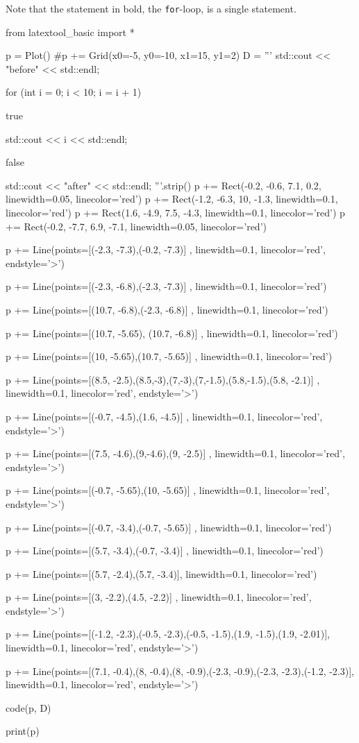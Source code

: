
Note that the statement in bold, the \texttt{for}-loop, is a single
statement.
\begin{python}
from latextool_basic import *

p = Plot()
#p += Grid(x0=-5, y0=-10, x1=15, y1=2)
D = '''
std::cout << "before" << std::endl;




for (int i = 0;        i < 10;        i = i + 1)



true

         std::cout << i << std::endl;

false




std::cout << "after" << std::endl;
'''.strip()
p += Rect(-0.2, -0.6, 7.1, 0.2, linewidth=0.05, linecolor='red')
p += Rect(-1.2, -6.3, 10, -1.3, linewidth=0.1, linecolor='red')
p += Rect(1.6, -4.9, 7.5, -4.3, linewidth=0.1, linecolor='red')
p += Rect(-0.2, -7.7, 6.9, -7.1, linewidth=0.05, linecolor='red')


p += Line(points=[(-2.3, -7.3),(-0.2, -7.3)] , linewidth=0.1, linecolor='red', endstyle='>')

p += Line(points=[(-2.3, -6.8),(-2.3, -7.3)] , linewidth=0.1, linecolor='red')

p += Line(points=[(10.7, -6.8),(-2.3, -6.8)] , linewidth=0.1, linecolor='red')

p += Line(points=[(10.7, -5.65), (10.7, -6.8)] , linewidth=0.1, linecolor='red')

p += Line(points=[(10, -5.65),(10.7, -5.65)] , linewidth=0.1, linecolor='red')

p += Line(points=[(8.5, -2.5),(8.5,-3),(7,-3),(7,-1.5),(5.8,-1.5),(5.8, -2.1)] , linewidth=0.1, linecolor='red', endstyle='>')

p += Line(points=[(-0.7, -4.5),(1.6, -4.5)] , linewidth=0.1, linecolor='red', endstyle='>')

p += Line(points=[(7.5, -4.6),(9,-4.6),(9, -2.5)] , linewidth=0.1, linecolor='red', endstyle='>')

p += Line(points=[(-0.7, -5.65),(10, -5.65)] , linewidth=0.1, linecolor='red', endstyle='>')

p += Line(points=[(-0.7, -3.4),(-0.7, -5.65)] , linewidth=0.1, linecolor='red')

p += Line(points=[(5.7, -3.4),(-0.7, -3.4)] , linewidth=0.1, linecolor='red')

p += Line(points=[(5.7, -2.4),(5.7, -3.4)], linewidth=0.1, linecolor='red')

p += Line(points=[(3, -2.2),(4.5, -2.2)] , linewidth=0.1, linecolor='red', endstyle='>')

p += Line(points=[(-1.2, -2.3),(-0.5, -2.3),(-0.5, -1.5),(1.9, -1.5),(1.9, -2.01)], linewidth=0.1, linecolor='red', endstyle='>')

p += Line(points=[(7.1, -0.4),(8, -0.4),(8, -0.9),(-2.3, -0.9),(-2.3, -2.3),(-1.2, -2.3)], linewidth=0.1, linecolor='red', endstyle='>')

code(p, D)

print(p)
\end{python}

